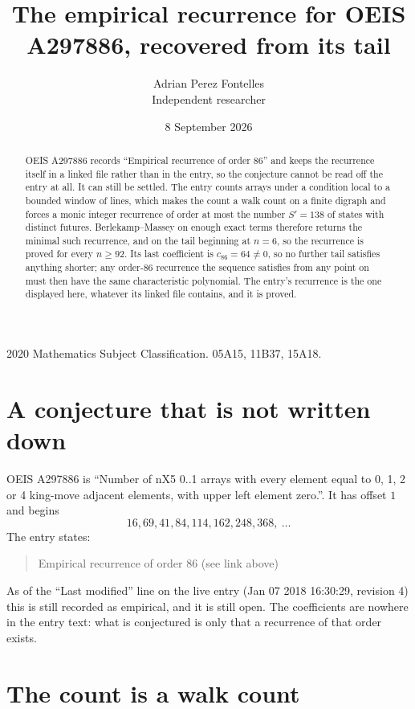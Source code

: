 \documentclass[11pt,a4paper]{article}
\title{The empirical recurrence for OEIS A297886, recovered from its tail}
\author{Adrian Perez Fontelles\\ \small Independent researcher}
\date{8 September 2026}
\theoremstyle{plain}
\theoremstyle{definition}
\begin{document}
\maketitle

\begin{abstract}
OEIS A297886 records ``Empirical recurrence of order $86$'' and keeps the recurrence itself in
a linked file rather than in the entry, so the conjecture cannot be read off the entry at all.
It can still be settled. The entry counts arrays under a condition local to a bounded window of
lines, which makes the count a walk count on a finite digraph and forces a monic integer
recurrence of order at most the number $S'=138$ of states with distinct futures. Berlekamp--Massey on
enough exact terms therefore returns the minimal such recurrence, and on the tail beginning at $n=6$, so the recurrence is proved for every $n\ge92$.
Its last coefficient is $c_{86}=64\neq0$, so no further tail satisfies anything
shorter; any order-$86$ recurrence the sequence satisfies from any point on must then have
the same characteristic polynomial. The entry's recurrence is the one displayed here, whatever
its linked file contains, and it is proved.
\end{abstract}

\noindent\small 2020 Mathematics Subject Classification. 05A15, 11B37, 15A18.\normalsize

\section{A conjecture that is not written down}

OEIS A297886 is ``Number of nX5 0..1 arrays with every element equal to 0, 1, 2 or 4 king-move adjacent elements, with upper left element zero.''. It has offset $1$ and begins
\[
16, 69, 41, 84, 114, 162, 248, 368,\ \dots
\]
The entry states:
\begin{quote}
Empirical recurrence of order 86 (see link above)
\end{quote}
As of the ``Last modified'' line on the live entry (Jan 07 2018 16:30:29, revision 4)
this is still recorded as empirical, and it is still open. The coefficients are nowhere in the
entry text: what is conjectured is only that a recurrence of that order exists.

\section{The count is a walk count}
\end{document}
